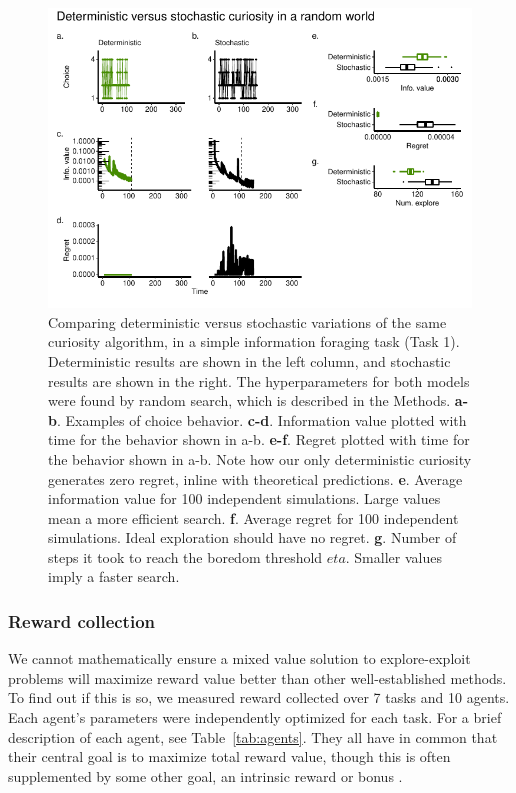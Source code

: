 \begin{figure}
	\includegraphics[width=1.0\linewidth]{img/curiosity1.pdf} 
	\caption{Comparing deterministic versus stochastic variations of the same curiosity algorithm, in a simple information foraging task (Task 1). Deterministic results are shown in the left column, and stochastic results are shown in the right. The hyperparameters for both models were found by random search, which is described in the Methods.
	\textbf{a-b}. Examples of choice behavior.
	\textbf{c-d}. Information value plotted with time for the behavior shown in a-b.
	\textbf{e-f}. Regret plotted with time for the behavior shown in a-b. Note how our only deterministic curiosity generates zero regret, inline with theoretical predictions.
	\textbf{e}. Average information value for 100 independent simulations. Large values mean a more efficient search.
	\textbf{f}. Average regret for 100 independent simulations. Ideal exploration should have no regret. 
	\textbf{g}. Number of steps it took to reach the boredom threshold $eta$. Smaller values imply a faster search.
	}
	\label{fig:curiosity1} 
\end{figure}


\subsubsection*{Reward collection} 
We cannot mathematically ensure a mixed value solution to explore-exploit problems will maximize reward value better than other well-established methods. To find out if this is so, we measured reward collected over 7 tasks and 10 agents. Each agent's parameters were independently optimized for each task. For a brief description of each agent, see Table~\ref{tab:agents}. They all have in common that their central goal is to maximize total reward value, though this is often supplemented by some other goal, an intrinsic reward or bonus \cite{Ng1999,Sutton1998}. 

